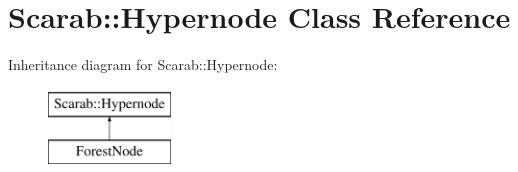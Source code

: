 \hypertarget{classScarab_1_1Hypernode}{
\section{Scarab::Hypernode Class Reference}
\label{classScarab_1_1Hypernode}
}
Inheritance diagram for Scarab::Hypernode:\begin{figure}[H]
\begin{center}
\leavevmode
\includegraphics[height=2cm]{classScarab_1_1Hypernode}
\end{center}
\end{figure}
